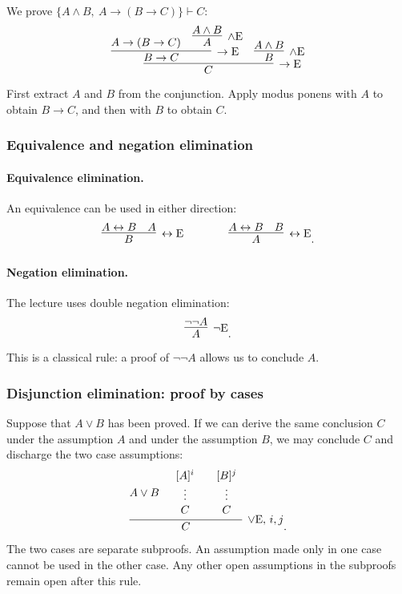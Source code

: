 \documentclass[11pt,a4paper]{amsart}
\begin{document}
\begin{example}
  We prove \(\{A\land B,\ A\to(B\to C)\}\vdash C\):
  \[
    \infer[\to\mathrm E]{C}{
      \infer[\to\mathrm E]{B\to C}{
        A\to(B\to C)
      & \infer[\land\mathrm E]{A}{A\land B}}
    & \infer[\land\mathrm E]{B}{A\land B}}
  \]
  First extract \(A\) and \(B\) from the conjunction. Apply modus ponens
  with \(A\) to obtain \(B\to C\), and then with \(B\) to obtain \(C\).
\end{example}

\subsubsection{Equivalence and negation elimination}

\paragraph{Equivalence elimination.} An equivalence can be used in
either direction:
\[
  \infer[\leftrightarrow\mathrm E]{B}{A\leftrightarrow B & A}
  \qquad\qquad
  \infer[\leftrightarrow\mathrm E]{A}{A\leftrightarrow B & B}.
\]

\paragraph{Negation elimination.} The lecture uses double negation elimination:
\[
  \infer[\neg\mathrm E]{A}{\neg\neg A}.
\]
This is a classical rule: a proof of \(\neg\neg A\) allows us to conclude
\(A\).

\subsubsection{Disjunction elimination: proof by cases}

Suppose that \(A\lor B\) has been proved. If we can derive the same
conclusion \(C\) under the assumption \(A\) and under the assumption
\(B\), we may conclude \(C\) and discharge the two case assumptions:
\[
  \infer[\lor\mathrm E,\,i,j]{C}{
    A\lor B
    &
    \begin{array}{c}[A]^i\\\vdots\\C
    \end{array}
    &
    \begin{array}{c}[B]^j\\\vdots\\C
  \end{array}}.
\]
The two cases are separate subproofs. An assumption made only in one case
cannot be used in the other case. Any other open assumptions in the
subproofs remain open after this rule.
\end{document}
